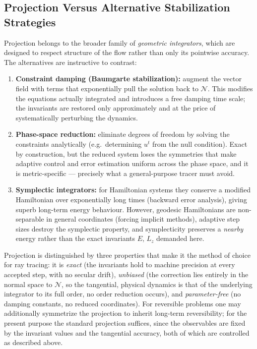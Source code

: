 \documentclass[11pt]{book}
\begin{document}
\subsection{Projection Versus Alternative Stabilization Strategies}
Projection belongs to the broader family of \emph{geometric integrators}, which are
designed to respect structure of the flow rather than only its pointwise accuracy. The
alternatives are instructive to contrast:
\begin{enumerate}
    \item \textbf{Constraint damping (Baumgarte stabilization):} augment the vector
    field with terms that exponentially pull the solution back to $\mathcal{N}$. This
    modifies the equations actually integrated and introduces a free damping time
    scale; the invariants are restored only approximately and at the price of
    systematically perturbing the dynamics.
    \item \textbf{Phase-space reduction:} eliminate degrees of freedom by solving the
    constraints analytically (e.g.\ determining $u^t$ from the null condition). Exact
    by construction, but the reduced system loses the symmetries that make adaptive
    control and error estimation uniform across the phase space, and it is
    metric-specific --- precisely what a general-purpose tracer must avoid.
    \item \textbf{Symplectic integrators:} for Hamiltonian systems they conserve a
    modified Hamiltonian over exponentially long times (backward error analysis),
    giving superb long-term energy behaviour. However, geodesic Hamiltonians are
    non-separable in general coordinates (forcing implicit methods), adaptive step
    sizes destroy the symplectic property, and symplecticity preserves a \emph{nearby}
    energy rather than the exact invariants $E$, $L_z$ demanded here.
\end{enumerate}
Projection is distinguished by three properties that make it the method of choice for
ray tracing: it is \emph{exact} (the invariants hold to machine precision at every
accepted step, with no secular drift), \emph{unbiased} (the correction lies entirely
in the normal space to $\mathcal{N}$, so the tangential, physical dynamics is that of
the underlying integrator to its full order, no order reduction occurs), and
\emph{parameter-free} (no damping constants, no reduced coordinates). For reversible
problems one may additionally symmetrize the projection to inherit long-term
reversibility; for the present purpose the standard projection suffices, since the
observables are fixed by the invariant values and the tangential accuracy, both of
which are controlled as described above.
\end{document}
